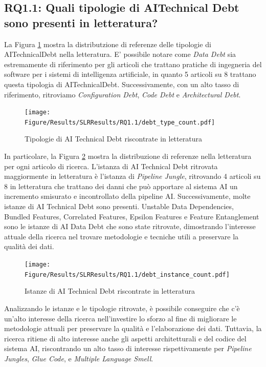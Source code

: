 \subsection{RQ1.1: Quali tipologie di AITechnical Debt sono presenti in letteratura?}
La Figura \ref{fig:slr_td_type} mostra la distributzione di referenze delle tipologie di AITechnicalDebt nella letteratura.
E' possibile notare come \textit{Data Debt} sia estremamente di riferimento per gli articoli che trattano pratiche di ingegneria del software per i sistemi di intelligenza artificiale, in quanto 5 articoli su 8 trattano questa tipologia di AITechnicalDebt.
Successivamente, con un alto tasso di riferimento, ritroviamo \textit{Configuration Debt}, \textit{Code Debt} e \textit{Architectural Debt}.

\begin{figure}[h!]
    \texttt{[image: Figure/Results/SLRResults/RQ1.1/debt\_type\_count.pdf]}
    \caption{Tipologie di AI Technical Debt riscontrate in letteratura}
    \label{fig:slr_td_type}
\end{figure}

In particolare, la Figura \ref{fig:slr_td_instances} mostra la distribuzione di referenze nella letteratura per ogni articolo di ricerca. L'istanza di AI Technical Debt ritrovata maggiormente in letteratura è l'istanza di \textit{Pipeline Jungle}, ritrovando 4 articoli su 8 in letteratura che trattano dei danni che può apportare al sistema AI un incremento smisurato e incontrollato della pipeline AI.
Successivamente, molte istanze di AI Technical Debt sono presenti.
Unstable Data Dependencies, Bundled Features, Correlated Features, Epsilon Features e Feature Entanglement sono le istanze di AI Data Debt che sono state ritrovate, dimostrando l'interesse attuale della ricerca nel trovare metodologie e tecniche utili a preservare la qualità dei dati.

\begin{figure}[h!]
    \texttt{[image: Figure/Results/SLRResults/RQ1.1/debt\_instance\_count.pdf]}
    \caption{Istanze di AI Technical Debt riscontrate in letteratura}
    \label{fig:slr_td_instances}
\end{figure}

Analizzando le istanze e le tipologie ritrovate, è possibile conseguire che c'è un'alto interesse della ricerca nell'investire lo sforzo al fine di migliorare le metodologie attuali per preservare la qualità e l'elaborazione dei dati.
Tuttavia, la ricerca ritiene di alto interesse anche gli aspetti architetturali e del codice del sistema AI, riscontrando un alto tasso di interesse rispettivamente per \textit{Pipeline Jungles}, \textit{Glue Code}, e \textit{Multiple Language Smell}.

